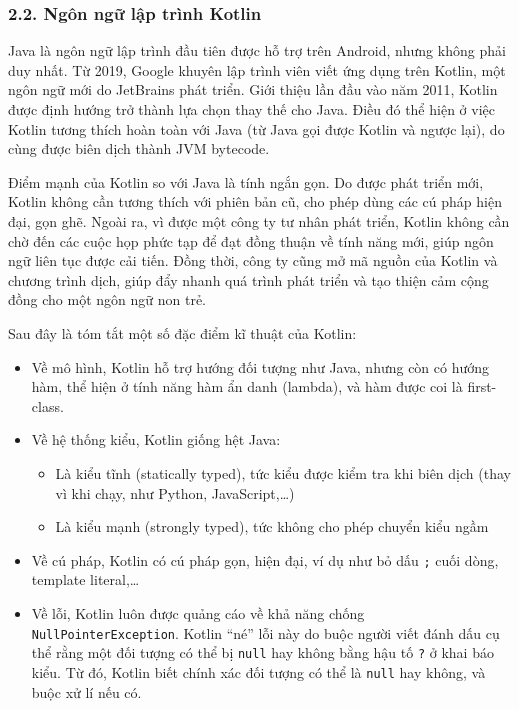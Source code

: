 \hypertarget{nguxf4n-ngux1eef-lux1eadp-truxecnh-kotlin}{%
  \subsubsection{\texorpdfstring{2.2. Ngôn ngữ lập trình Kotlin
    }{2.2. Ngôn ngữ lập trình Kotlin }}\label{nguxf4n-ngux1eef-lux1eadp-truxecnh-kotlin}}

Java là ngôn ngữ lập trình đầu tiên được hỗ trợ trên Android, nhưng
không phải duy nhất. Từ 2019, Google khuyên lập trình viên viết ứng dụng
trên Kotlin, một ngôn ngữ mới do JetBrains phát triển. Giới thiệu lần
đầu vào năm 2011, Kotlin được định hướng trở thành lựa chọn thay thế cho
Java. Điều đó thể hiện ở việc Kotlin tương thích hoàn toàn với Java (từ
Java gọi được Kotlin và ngược lại), do cùng được biên dịch thành JVM
bytecode.

Điểm mạnh của Kotlin so với Java là tính ngắn gọn. Do được phát triển
mới, Kotlin không cần tương thích với phiên bản cũ, cho phép dùng các cú
pháp hiện đại, gọn ghẽ. Ngoài ra, vì được một công ty tư nhân phát
triển, Kotlin không cần chờ đến các cuộc họp phức tạp để đạt đồng thuận
về tính năng mới, giúp ngôn ngữ liên tục được cải tiến. Đồng thời, công
ty cũng mở mã nguồn của Kotlin và chương trình dịch, giúp đẩy nhanh quá
trình phát triển và tạo thiện cảm cộng đồng cho một ngôn ngữ non trẻ.

Sau đây là tóm tắt một số đặc điểm kĩ thuật của Kotlin:

\begin{itemize}
  
  \item
        Về mô hình, Kotlin hỗ trợ hướng đối tượng như Java, nhưng còn có hướng
        hàm, thể hiện ở tính năng hàm ẩn danh (lambda), và hàm được coi là
        first-class.
  \item
        Về hệ thống kiểu, Kotlin giống hệt Java:

        \begin{itemize}
          
          \item
                Là kiểu tĩnh (statically typed), tức kiểu được kiểm tra khi biên
                dịch (thay vì khi chạy, như Python, JavaScript,\ldots)
          \item
                Là kiểu mạnh (strongly typed), tức không cho phép chuyển kiểu ngầm
        \end{itemize}
  \item
        Về cú pháp, Kotlin có cú pháp gọn, hiện đại, ví dụ như bỏ dấu
        \texttt{;} cuối dòng, template literal,\ldots{}
  \item
        Về lỗi, Kotlin luôn được quảng cáo về khả năng chống
        \texttt{NullPointerException}. Kotlin ``né'' lỗi này do buộc người
        viết đánh dấu cụ thể rằng một đối tượng có thể bị \texttt{null} hay
        không bằng hậu tố \texttt{?} ở khai báo kiểu. Từ đó, Kotlin biết chính
        xác đối tượng có thể là \texttt{null} hay không, và buộc xử lí nếu có.
\end{itemize}

